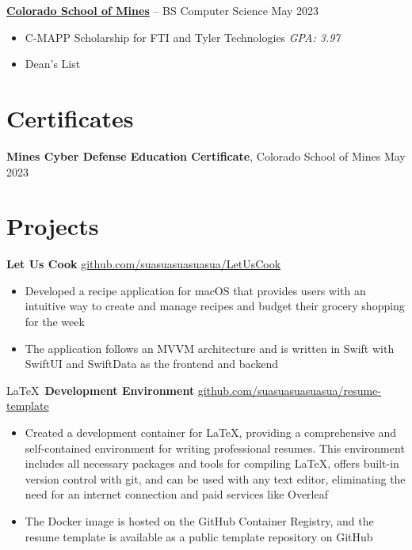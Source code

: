 \documentclass[11pt]{article}       %
\begin{document}
\vspace{-6.5pt}

\textbf{\href{https://cs.mines.edu}{Colorado School of Mines}} -- BS Computer Science \hfill May 2023 \\
\vspace{-11.5pt}
\begin{itemize}
      \itemsep -0.5em
      \item C-MAPP Scholarship for FTI and Tyler Technologies \hfill \textit{GPA: 3.97}
      \item Dean's List \hfill
\end{itemize}

\vspace{-18.5pt}

\section*{Certificates}
\textbf{Mines Cyber Defense Education Certificate}, {Colorado School of Mines} \hfill May 2023 \\

\vspace{-6.5pt}

\section*{Projects}
\textbf{Let Us Cook} \hfill \href{https://github.com/suasuasuasuasua/LetUsCook}{github.com/suasuasuasuasua/LetUsCook} \\
\vspace{-9pt}
\begin{itemize}
      \item Developed a recipe application for macOS that provides users with an
            intuitive way to create and manage recipes and budget their grocery
            shopping for the week
      \item The application follows an MVVM architecture and is written in Swift
            with SwiftUI and SwiftData as the frontend and backend
\end{itemize}

\LaTeX \, \textbf{Development Environment} \hfill
\href{https://github.com/suasuasuasuasua/resume-template}{github.com/suasuasuasuasua/resume-template}
\\
\vspace{-9pt}
\begin{itemize}
      \item Created a development container for \LaTeX, providing a
            comprehensive and self-contained environment for writing
            professional resumes. This environment includes all necessary
            packages and tools for compiling \LaTeX, offers built-in version
            control with git, and can be used with any text editor, eliminating
            the need for an internet connection and paid services like Overleaf
      \item The Docker image is hosted on the GitHub Container Registry, and the
            resume template is available as a public template repository on
            GitHub
\end{itemize}
\end{document}
